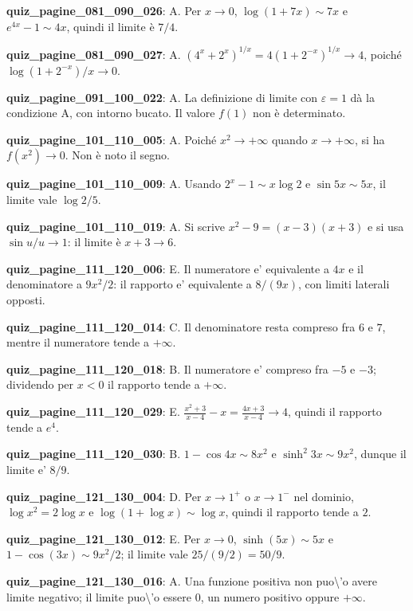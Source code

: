 \documentclass[11pt,a4paper]{article}
\newcounter{quiz}
\begin{document}
\noindent\textbf{quiz\_pagine\_081\_090\_026}: A. Per $x\to0$, $\log(1+7x)\sim7x$ e $e^{4x}-1\sim4x$, quindi il limite è $7/4$.\par\medskip
\noindent\textbf{quiz\_pagine\_081\_090\_027}: A. $(4^x+2^x)^{1/x}=4(1+2^{-x})^{1/x}\to4$, poiché $\log(1+2^{-x})/x\to0$.\par\medskip
\noindent\textbf{quiz\_pagine\_091\_100\_022}: A. La definizione di limite con $\varepsilon=1$ dà la condizione A, con intorno bucato. Il valore $f(1)$ non è determinato.\par\medskip
\noindent\textbf{quiz\_pagine\_101\_110\_005}: A. Poiché $x^2\to+\infty$ quando $x\to+\infty$, si ha $f(x^2)\to0$. Non è noto il segno.\par\medskip
\noindent\textbf{quiz\_pagine\_101\_110\_009}: A. Usando $2^x-1\sim x\log2$ e $\sin5x\sim5x$, il limite vale $\log2/5$.\par\medskip
\noindent\textbf{quiz\_pagine\_101\_110\_019}: A. Si scrive $x^2-9=(x-3)(x+3)$ e si usa $\sin u/u\to1$: il limite è $x+3\to6$.\par\medskip
\noindent\textbf{quiz\_pagine\_111\_120\_006}: E. Il numeratore e' equivalente a $4x$ e il denominatore a $9x^2/2$: il rapporto e' equivalente a $8/(9x)$, con limiti laterali opposti.\par\medskip
\noindent\textbf{quiz\_pagine\_111\_120\_014}: C. Il denominatore resta compreso fra $6$ e $7$, mentre il numeratore tende a $+\infty$.\par\medskip
\noindent\textbf{quiz\_pagine\_111\_120\_018}: B. Il numeratore e' compreso fra $-5$ e $-3$; dividendo per $x<0$ il rapporto tende a $+\infty$.\par\medskip
\noindent\textbf{quiz\_pagine\_111\_120\_029}: E. $\frac{x^2+3}{x-4}-x=\frac{4x+3}{x-4}\to4$, quindi il rapporto tende a $e^4$.\par\medskip
\noindent\textbf{quiz\_pagine\_111\_120\_030}: B. $1-\cos4x\sim8x^2$ e $\sinh^2 3x\sim9x^2$, dunque il limite e' $8/9$.\par\medskip
\noindent\textbf{quiz\_pagine\_121\_130\_004}: D. Per $x\to1^+$ o $x\to1^-$ nel dominio, $\log x^2=2\log x$ e $\log(1+\log x)\sim\log x$, quindi il rapporto tende a $2$.\par\medskip
\noindent\textbf{quiz\_pagine\_121\_130\_012}: E. Per $x\to0$, $\sinh(5x)\sim5x$ e $1-\cos(3x)\sim9x^2/2$; il limite vale $25/(9/2)=50/9$.\par\medskip
\noindent\textbf{quiz\_pagine\_121\_130\_016}: A. Una funzione positiva non puo\textbackslash{}'o avere limite negativo; il limite puo\textbackslash{}'o essere $0$, un numero positivo oppure $+\infty$.\par\medskip
\end{document}
